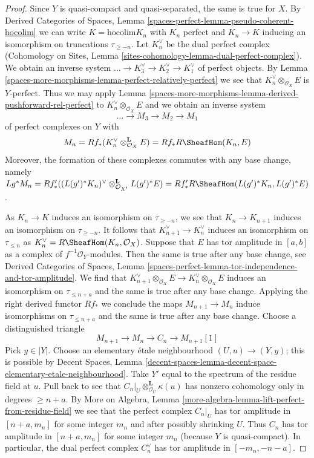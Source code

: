 \begin{proof}
Since $Y$ is quasi-compact and quasi-separated, the same is true for $X$.
By Derived Categories of Spaces, Lemma
\ref{spaces-perfect-lemma-pseudo-coherent-hocolim} we can write
$K = \text{hocolim} K_n$ with $K_n$ perfect and $K_n \to K$ inducing
an isomorphism on truncations $\tau_{\geq -n}$. Let $K_n^\vee$
be the dual perfect complex
(Cohomology on Sites, Lemma \ref{sites-cohomology-lemma-dual-perfect-complex}).
We obtain an inverse system $\ldots \to K_3^\vee \to K_2^\vee \to K_1^\vee$
of perfect objects. By Lemma \ref{spaces-more-morphisms-lemma-perfect-relatively-perfect}
we see that $K_n^\vee \otimes_{\mathcal{O}_X} E$ is $Y$-perfect.
Thus we may apply Lemma \ref{spaces-more-morphisms-lemma-derived-pushforward-rel-perfect}
to $K_n^\vee \otimes_{\mathcal{O}_X} E$ and we obtain an inverse system
$$
\ldots \to M_3 \to M_2 \to M_1
$$
of perfect complexes on $Y$ with
$$
M_n = Rf_*(K_n^\vee \otimes_{\mathcal{O}_X}^\mathbf{L} E) =
Rf_*R\SheafHom(K_n, E)
$$
Moreover, the formation of these complexes commutes with any
base change, namely $Lg^*M_n =
Rf'_*((L(g')^*K_n)^\vee \otimes_{\mathcal{O}_{X'}}^\mathbf{L} L(g')^*E) =
Rf'_*R\SheafHom(L(g')^*K_n, L(g')^*E)$.

\medskip\noindent
As $K_n \to K$ induces an isomorphism on $\tau_{\geq -n}$, we see that
$K_n \to K_{n + 1}$ induces an isomorphism on $\tau_{\geq -n}$.
It follows that $K_{n + 1}^\vee \to K_n^\vee$
induces an isomorphism on $\tau_{\leq n}$ as
$K_n^\vee = R\SheafHom(K_n, \mathcal{O}_X)$.
Suppose that $E$ has tor amplitude in $[a, b]$ as a complex
of $f^{-1}\mathcal{O}_Y$-modules. Then the same is true after
any base change, see
Derived Categories of Spaces, Lemma
\ref{spaces-perfect-lemma-tor-independence-and-tor-amplitude}.
We find that
$K_{n + 1}^\vee \otimes_{\mathcal{O}_X} E \to
K_n^\vee \otimes_{\mathcal{O}_X} E$
induces an isomorphism on $\tau_{\leq n + a}$
and the same is true after any base change.
Applying the right derived functor $Rf_*$
we conclude the maps $M_{n + 1} \to M_n$
induce isomorphisms on $\tau_{\leq n + a}$
and the same is true after any base change.
Choose a distinguished triangle
$$
M_{n + 1} \to M_n \to C_n \to M_{n + 1}[1]
$$
Pick $y \in |Y|$. Choose an elementary \'etale neighbourhood
$(U, u) \to (Y, y)$; this is possible by
Decent Spaces, Lemma
\ref{decent-spaces-lemma-decent-space-elementary-etale-neighbourhood}.
Take $Y'$ equal to the spectrum of the residue field at $u$.
Pull back to see that $C_n|_U \otimes_{\mathcal{O}_U}^\mathbf{L} \kappa(u)$
has nonzero cohomology only in degrees $\geq n + a$. By
More on Algebra, Lemma
\ref{more-algebra-lemma-lift-perfect-from-residue-field}
we see that the perfect complex $C_n|_U$ has tor amplitude in
$[n + a, m_n]$ for some integer $m_n$ and after possibly shrinking $U$.
Thus $C_n$ has tor amplitude in $[n + a, m_n]$ for some integer $m_n$
(because $Y$ is quasi-compact).
In particular, the dual perfect complex $C_n^\vee$ has tor amplitude in
$[-m_n, -n - a]$.


\end{proof}
